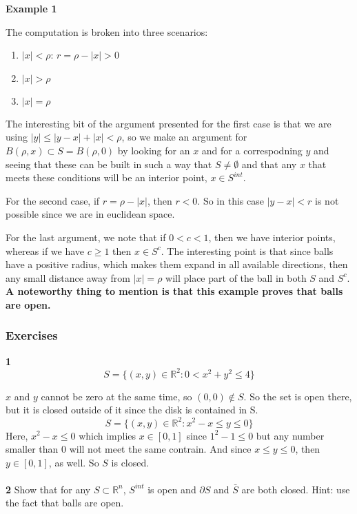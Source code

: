 \textbf{Example 1}

The computation is broken into three scenarios:
\begin{enumerate}
    \item $|x| < \rho$: $r = \rho - |x| > 0$
    \item $|x| > \rho$
    \item $|x| = \rho$
\end{enumerate}

The interesting bit of the argument presented for the first case is that we are using
$|y| \leq |y-x| + |x| < \rho$, so we make an argument for $B(\rho ,x) \subset S = B(\rho, 0)$
by looking for an $x$ and for a correspodning $y$ and seeing that these can be built in such a way that
$S \neq \emptyset$ and that any $x$ that meets these conditions will be an interior point, $x\in S^{int}$.

For the second case, if $r = \rho - |x|$, then $r < 0$.
So in this case $|y-x| < r$ is not possible since we are in euclidean space.

For the last argument, we note that if $0 < c < 1$, then we have interior points, whereas if we have
$c \geq 1$ then $x\in S^c$.
The interesting point is that since balls have a positive radius, which makes them expand in all
available directions, then any small distance away from $|x| = \rho$ will place part of the
ball in both $S$ and $S^c$.
\\

\textbf{A noteworthy thing to mention is that this example proves that balls are open.}


\subsubsection{Exercises}

\textbf{1}
$$
S = \{ (x,y)\in\mathbb{R}^2 : 0 < x^2 + y^2 \leq 4 \}
$$

$x$ and $y$ cannot be zero at the same time, so $(0,0) \notin S$.
So the set is open there, but it is closed outside of it since the disk is contained in S.
\\

$$
S = \{ (x,y)\in\mathbb{R}^2 : x^2 - x \leq y \leq 0 \}
$$
Here, $x^2 - x \leq 0$ which implies $x \in [0,1]$ since $1^2 - 1 \leq 0$ but any number smaller than 0
will not meet the same contrain.
And since $x \leq y \leq 0$, then $y \in [0,1]$, as well.
So $S$ is closed.
\\~\\


\textbf{2}
Show that for any $S \subset \mathbb{R}^n$, $S^{int}$ is open and $\partial S$ and $\bar{S}$ are both closed.
Hint: use the fact that balls are open.